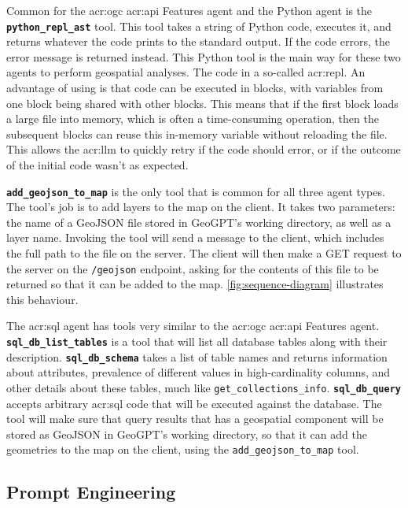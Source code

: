 Common for the \acrshort{acr:ogc} \acrshort{acr:api} Features agent and the Python agent is the \textbf{\texttt{python\_repl\_ast}} tool. This tool takes a string of Python code, executes it, and returns whatever the code prints to the standard output. If the code errors, the error message is returned instead. This Python tool is the main way for these two agents to perform geospatial analyses. The code in a so-called \acrfull{acr:repl}. An advantage of using  is that code can be executed in blocks, with variables from one block being shared with other blocks. This means that if the first block loads a large file into memory, which is often a time-consuming operation, then the subsequent blocks can reuse this in-memory variable without reloading the file. This allows the \acrshort{acr:llm} to quickly retry if the code should error, or if the outcome of the initial code wasn't as expected.

\textbf{\texttt{add\_geojson\_to\_map}} is the only tool that is common for all three agent types. The tool's job is to add layers to the map on the client. It takes two parameters: the name of a GeoJSON file stored in GeoGPT's working directory, as well as a layer name. Invoking the tool will send a message to the client, which includes the full path to the file on the server. The client will then make a GET request to the server on the \texttt{/geojson} endpoint, asking for the contents of this file to be returned so that it can be added to the map. \autoref{fig:sequence-diagram} illustrates this behaviour.

The \acrshort{acr:sql} agent has tools very similar to the \acrshort{acr:ogc} \acrshort{acr:api} Features agent. \textbf{\texttt{sql\_db\_list\_tables}} is a tool that will list all database tables along with their description. \textbf{\texttt{sql\_db\_schema}} takes a list of table names and returns information about attributes, prevalence of different values in high-cardinality columns, and other details about these tables, much like \texttt{get\_collections\_info}. \textbf{\texttt{sql\_db\_query}} accepts arbitrary \acrshort{acr:sql} code that will be executed against the database. The tool will make sure that query results that has a geospatial component will be stored as GeoJSON in GeoGPT's working directory, so that it can add the geometries to the map on the client, using the \texttt{add\_geojson\_to\_map} tool.


\subsection{Prompt Engineering}
\label{subsec:prompt-engineering-architecture}

